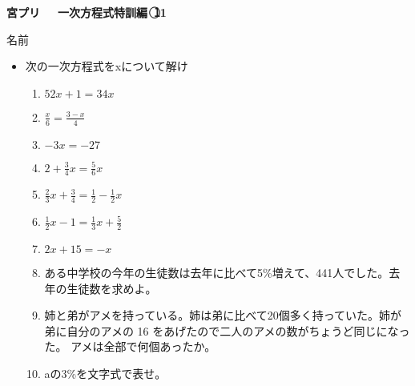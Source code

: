 \documentclass[a4paper,fleqn,papersize,15pt]{jsarticle}
\begin{document}
\clearpage
 \begin{center}
   \LARGE\textbf{宮プリ　~一次方程式特訓編~\textcircled{\scriptsize 11}}
     \begin{flushright}
       名前\underline{\hspace{8zw}}
     \end{flushright}
 \end{center}

 \begin{itemize}
   \item 次の一次方程式をxについて解け
   \begin{enumerate}
\item $52x+1=34x$ \begin{flushright}\framebox[8em]{\rule{0pt}{6ex}}\end{flushright} %
\item $\frac{x}{6} = \frac{3-x}{4}$ \begin{flushright}\framebox[8em]{\rule{0pt}{6ex}}\end{flushright} %
\item $-3x=-27$ \begin{flushright}\framebox[8em]{\rule{0pt}{6ex}}\end{flushright} %
\item $2+ \frac{3}{4} x= \frac{5}{6} x$ \begin{flushright}\framebox[8em]{\rule{0pt}{6ex}}\end{flushright} %
\item $\frac{2}{3} x+ \frac{3}{4} = \frac{1}{2} - \frac{1}{2}x$ \begin{flushright}\framebox[8em]{\rule{0pt}{6ex}}\end{flushright} %
\item $\frac{1}{2} x-1= \frac{1}{3}x+ \frac{5}{2}$ \begin{flushright}\framebox[8em]{\rule{0pt}{6ex}}\end{flushright} %
\item $2x+15=-x$ \begin{flushright}\framebox[8em]{\rule{0pt}{6ex}}\end{flushright} %
\item ある中学校の今年の生徒数は去年に比べて5\%増えて、441人でした。去年の生徒数を求めよ。 \vfill \begin{flushright}\framebox[8em]{\rule{0pt}{6ex}}\end{flushright} %
\item 姉と弟がアメを持っている。姉は弟に比べて20個多く持っていた。姉が弟に自分のアメの 16 をあげたので二人のアメの数がちょうど同じになった。 アメは全部で何個あったか。 \vfill \begin{flushright}\framebox[8em]{\rule{0pt}{6ex}}\end{flushright} %
\item aの3\%を文字式で表せ。 \vfill \begin{flushright}\framebox[8em]{\rule{0pt}{6ex}}\end{flushright} %
\end{enumerate}
    \vfill
\end{itemize}
\end{document}
